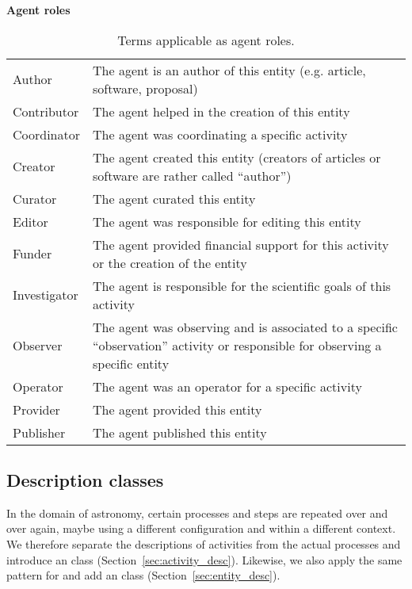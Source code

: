 \begin{table}[ht]
\small
{}\textwidth
\textbf{\normalsize Agent roles}\vspace{0.25em}\\
\begin{tabulary}{1.0\textwidth}{lL}
\toprule
{} &  \\
\midrule
Author      & The agent is an author of this entity (e.g. article, software, proposal)\\
Contributor & The agent helped in the creation of this entity \\
Coordinator & The agent was coordinating a specific activity \\ %
Creator     & The agent created this entity (creators of articles or software are rather called ``author'') \\
Curator     & The agent curated this entity \\
Editor      & The agent was responsible for editing this entity \\
Funder      & The agent provided financial support for this activity or the creation of the entity \\
Investigator & The agent is responsible for the scientific goals of this activity \\
Observer    & The agent was observing and is associated to a specific “observation” activity or responsible for observing a specific entity \\
Operator    & The agent was an operator for a specific activity \\ %
Provider    & The agent provided this entity \\
Publisher   & The agent published this entity \\
\bottomrule
\end{tabulary}
\caption[Terms applicable as agent roles.]{Terms applicable as agent roles.}
\label{tab:agent-roles}
\end{table}




\subsection{Description classes}
\label{sec:descriptions}

In the domain of astronomy, certain processes and steps are repeated over and over again, maybe using a different configuration and within a different context. 
We therefore separate the descriptions of activities from the actual processes and introduce an  class (Section~\ref{sec:activity_desc}). 
Likewise, we also apply the same pattern for  and add an  class (Section~\ref{sec:entity_desc}). 

